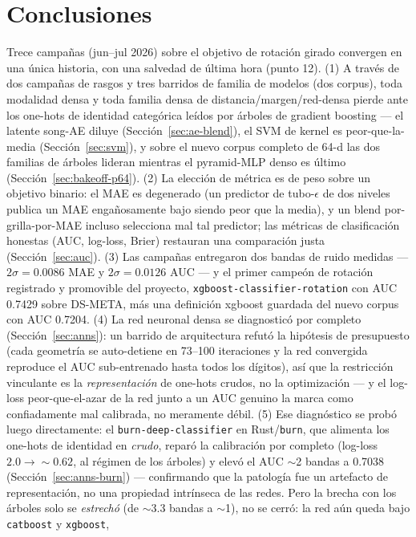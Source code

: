 \documentclass[11pt]{article}
\begin{document}
\section{Conclusiones}
\label{sec:conclusions}
Trece campañas (jun--jul 2026) sobre el objetivo de rotación girado convergen en
una única historia, con una salvedad de última hora (punto 12). (1) A través de dos
campañas de rasgos y tres barridos de familia de modelos (dos corpus), toda
modalidad densa y toda familia densa de distancia/margen/red-densa pierde ante los
one-hots de identidad categórica leídos por árboles de gradient boosting --- el
latente song-AE diluye (Sección~\ref{sec:ae-blend}), el SVM de kernel es
peor-que-la-media (Sección~\ref{sec:svm}), y sobre el nuevo corpus completo de 64-d
las dos familias de árboles lideran mientras el pyramid-MLP denso es último
(Sección~\ref{sec:bakeoff-p64}). (2) La elección de métrica es de peso sobre un
objetivo binario: el MAE es degenerado (un predictor de tubo-$\epsilon$ de dos
niveles publica un MAE engañosamente bajo siendo peor que la media), y un blend
por-grilla-por-MAE incluso selecciona mal tal predictor; las métricas de
clasificación honestas (AUC, log-loss, Brier) restauran una comparación justa
(Sección~\ref{sec:auc}). (3) Las campañas entregaron dos bandas de ruido medidas ---
$2\sigma=0.0086$ MAE y $2\sigma=0.0126$ AUC --- y el primer campeón de rotación
registrado y promovible del proyecto, \texttt{xgboost-classifier-rotation} con AUC
0.7429 sobre DS-META, más una definición xgboost guardada del nuevo corpus con AUC
0.7204. (4) La red neuronal densa se diagnosticó por completo
(Sección~\ref{sec:anns}): un barrido de arquitectura refutó la hipótesis de
presupuesto (cada geometría se auto-detiene en 73--100 iteraciones y la red
convergida reproduce el AUC sub-entrenado hasta todos los dígitos), así que la
restricción vinculante es la \emph{representación} de one-hots crudos, no la
optimización --- y el log-loss peor-que-el-azar de la red junto a un AUC genuino la
marca como confiadamente mal calibrada, no meramente débil. (5) Ese diagnóstico se
probó luego directamente: el \texttt{burn-deep-classifier} en Rust/\texttt{burn},
que alimenta los one-hots de identidad en \emph{crudo}, reparó la calibración por
completo (log-loss $2.0\to\sim 0.62$, al régimen de los árboles) y elevó el AUC
$\sim$2 bandas a \num{0.7038} (Sección~\ref{sec:anns-burn}) --- confirmando que la
patología fue un artefacto de representación, no una propiedad intrínseca de las
redes. Pero la brecha con los árboles solo se \emph{estrechó} (de $\sim$3.3 bandas a
$\sim$1), no se cerró: la red aún queda bajo \texttt{catboost} y \texttt{xgboost},
\end{document}
